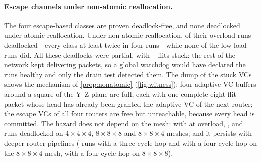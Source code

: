 \paragraph{Escape channels under non-atomic reallocation.} The four escape-based classes are proven deadlock-free, and none deadlocked under atomic reallocation. Under non-atomic reallocation,  of their  overload runs deadlocked---every class at least twice in four runs---while none of the low-load runs did. All these deadlocks were partial, with -- flits stuck: the rest of the network kept delivering packets, so a global watchdog would have declared the runs healthy and only the drain test detected them. The dump of the stuck VCs shows the mechanism of \cref{prop:nonatomic} (\cref{fig:witness}): four adaptive VC buffers around a square of the Y--Z plane are full, each with one complete eight-flit packet whose head has already been granted the adaptive VC of the next router; the escape VCs of all four routers are free but unreachable, because every head is committed. The hazard does not depend on the mesh: with  at overload, ,  and  runs deadlocked on $4\times4\times4$, $8\times8\times8$ and $8\times8\times4$ meshes; and it persists with deeper router pipelines ( runs with a three-cycle hop and  with a four-cycle hop on the $8\times8\times4$ mesh,  with a four-cycle hop on $8\times8\times8$).


